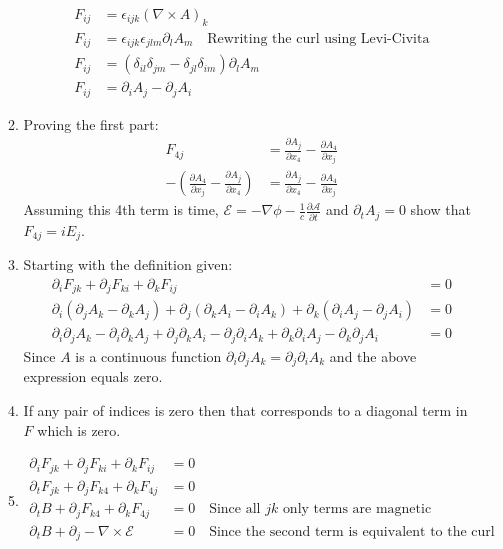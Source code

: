 \documentclass[12pt]{article}
\newcommand{\p}[2]{\frac{\partial #1}{\partial #2}}
\newcommand{\curl}{\nabla\times}
\begin{document}
\begin{enumerate}
\begin{enumerate}
      \begin{align*}
        F_{ij}&=\epsilon_{ijk}(\curl A)_k\\
        F_{ij}&=\epsilon_{ijk}\epsilon_{jlm}\partial_l A_m\quad\text{Rewriting the curl using Levi-Civita}\\
        F_{ij}&=(\delta_{il}\delta_{jm}-\delta_{jl}\delta_{im})\partial_l A_m\\
        F_{ij}&=\partial_i A_j-\partial_j A_i
      \end{align*}
      \item Proving the first part:
      \begin{align*}
        F_{4j}&=\p{A_j}{x_4}-\p{A_4}{x_j}\\
        -(\p{A_4}{x_j}-\p{A_j}{x_4})&=\p{A_j}{x_4}-\p{A_4}{x_j}
      \end{align*}
      Assuming this 4th term is time, $\mathcal{E}=-\nabla\phi-\frac{1}{c}\p{\mathcal{A}}{t}$ and $\partial_t A_j=0$ show that $F_{4j}=iE_j$.
      \item Starting with the definition given:
      \begin{align*}
        \partial_i F_{jk}+\partial_j F_{ki}+\partial_k F_{ij}&=0\\
        \partial_i (\partial_j A_k-\partial_k A_j)+\partial_j (\partial_k A_i-\partial_i A_k)+\partial_k (\partial_i A_j-\partial_j A_i)&=0\\
        \partial_i\partial_j A_k-\partial_i\partial_k A_j+\partial_j\partial_k A_i-\partial_j\partial_i A_k+\partial_k\partial_i A_j-\partial_k\partial_j A_i&=0
      \end{align*}
      Since $A$ is a continuous function $\partial_i\partial_j A_k=\partial_j\partial_i A_k$ and the above expression equals zero.
      \item If any pair of indices is zero then that corresponds to a diagonal term in $F$ which is zero.
      \item
      \begin{align*}
        \partial_i F_{jk}+\partial_j F_{ki}+\partial_k F_{ij}&=0\\
        \partial_t F_{jk}+\partial_j F_{k4}+\partial_k F_{4j}&=0\\
        \partial_t B+\partial_j F_{k4}+\partial_k F_{4j}&=0\quad\text{Since all $jk$ only terms are magnetic}\\
        \partial_t B+\partial_j -\curl\mathcal{E}&=0\quad\text{Since the second term is equivalent to the curl}\\
      \end{align*}

\end{enumerate}
\end{enumerate}
\end{document}
